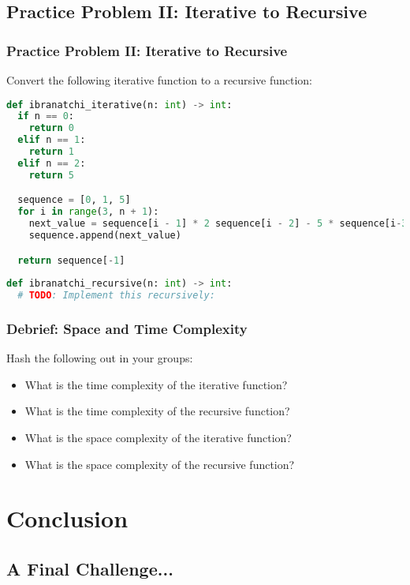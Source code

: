 \documentclass[hyperref={colorlinks,citecolor=blue,linkcolor=blue,urlcolor=blue}]{beamer}
\begin{document}
\subsection{Practice Problem II: Iterative to Recursive}

\begin{frame}[fragile]
  \frametitle{Practice Problem II: Iterative to Recursive}
  
  Convert the following iterative function to a recursive function:
  
  \begin{lstlisting}[language=Python, style=mystyle]
def ibranatchi_iterative(n: int) -> int:
  if n == 0:
    return 0
  elif n == 1:
    return 1
  elif n == 2:
    return 5

  sequence = [0, 1, 5]
  for i in range(3, n + 1):
    next_value = sequence[i - 1] * 2 sequence[i - 2] - 5 * sequence[i-3]
    sequence.append(next_value)

  return sequence[-1]
 
def ibranatchi_recursive(n: int) -> int:
  # TODO: Implement this recursively:

  \end{lstlisting}
\end{frame}

\begin{frame}
  \frametitle{Debrief: Space and Time Complexity}
  Hash the following out in your groups:
  \begin{itemize}
    \item What is the time complexity of the iterative function?
    \item What is the time complexity of the recursive function?
    \item What is the space complexity of the iterative function?
    \item What is the space complexity of the recursive function?
\end{itemize}
\end{frame}

\section{Conclusion}
\subsection{A Final Challenge...}
\end{document}
